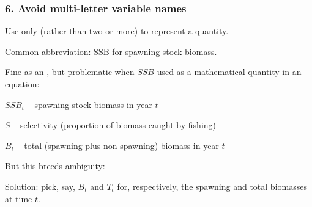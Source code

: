 
\begin{frame}
\frametitle{6. Avoid multi-letter variable names}

Use only  (rather than two or more) to represent a quantity.

Common abbreviation: SSB for spawning stock biomass.

Fine as an , but problematic when $SSB$ used as a
mathematical quantity in an equation:

\bi
  \item $SSB_t$ -- spawning stock biomass in year $t$
  \item $S$ -- selectivity (proportion of biomass caught by fishing)
  \item $B_t$ -- total (spawning plus non-spawning) biomass in year $t$
\ei

But this breeds ambiguity:
\eb
\nonumber {} 
\ee
\pause


Solution: pick, say, $B_t$ and $T_t$ for, respectively, the spawning and total biomasses at time $t$.

\end{frame}


